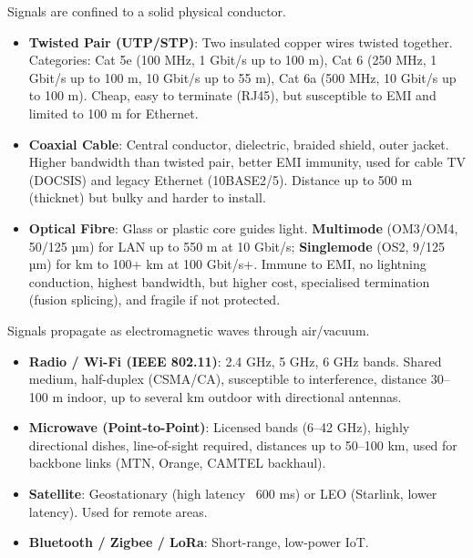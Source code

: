 \documentclass[11pt]{article}
\begin{document}
\begin{definition}
Signals are confined to a solid physical conductor.
\begin{itemize}
\item \textbf{Twisted Pair (UTP/STP)}: Two insulated copper wires twisted together. Categories: Cat 5e (100 MHz, 1 Gbit/s up to 100 m), Cat 6 (250 MHz, 1 Gbit/s up to 100 m, 10 Gbit/s up to 55 m), Cat 6a (500 MHz, 10 Gbit/s up to 100 m). Cheap, easy to terminate (RJ45), but susceptible to EMI and limited to 100 m for Ethernet.
\item \textbf{Coaxial Cable}: Central conductor, dielectric, braided shield, outer jacket. Higher bandwidth than twisted pair, better EMI immunity, used for cable TV (DOCSIS) and legacy Ethernet (10BASE2/5). Distance up to 500 m (thicknet) but bulky and harder to install.
\item \textbf{Optical Fibre}: Glass or plastic core guides light. \textbf{Multimode} (OM3/OM4, 50/125 µm) for LAN up to 550 m at 10 Gbit/s; \textbf{Singlemode} (OS2, 9/125 µm) for km to 100+ km at 100 Gbit/s+. Immune to EMI, no lightning conduction, highest bandwidth, but higher cost, specialised termination (fusion splicing), and fragile if not protected.
\end{itemize}
\end{definition}

\begin{definition}
Signals propagate as electromagnetic waves through air/vacuum.
\begin{itemize}
\item \textbf{Radio / Wi-Fi (IEEE 802.11)}: 2.4 GHz, 5 GHz, 6 GHz bands. Shared medium, half-duplex (CSMA/CA), susceptible to interference, distance 30–100 m indoor, up to several km outdoor with directional antennas.
\item \textbf{Microwave (Point-to-Point)}: Licensed bands (6–42 GHz), highly directional dishes, line-of-sight required, distances up to 50–100 km, used for backbone links (MTN, Orange, CAMTEL backhaul).
\item \textbf{Satellite}: Geostationary (high latency ~600 ms) or LEO (Starlink, lower latency). Used for remote areas.
\item \textbf{Bluetooth / Zigbee / LoRa}: Short-range, low-power IoT.
\end{itemize}
\end{definition}
\end{document}
